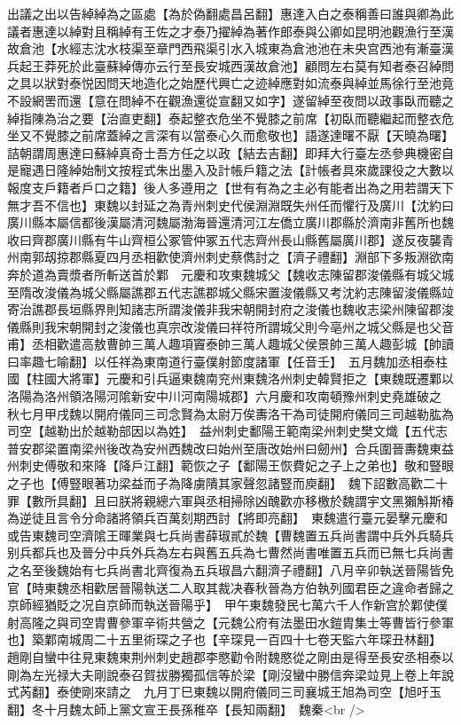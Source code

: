 出議之出以告綽綽為之區處【為於偽翻處昌呂翻】惠達入白之泰稱善曰誰與卿為此議者惠達以綽對且稱綽有王佐之才泰乃擢綽為著作郎泰與公卿如昆明池觀漁行至漢故倉池【水經志沈水枝渠至章門西飛渠引水入城東為倉池池在未央宫西池有漸臺漢兵起王莽死於此臺蘇綽傳亦云行至長安城西漢故倉池】顧問左右莫有知者泰召綽問之具以狀對泰悦因問天地造化之始歷代興亡之迹綽應對如流泰與綽並馬徐行至池竟不設網罟而還【意在問綽不在觀漁還從宣翻又如字】遂留綽至夜問以政事臥而聽之綽指陳為治之要【治直吏翻】泰起整衣危坐不覺膝之前席【初臥而聽繼起而整衣危坐又不覺膝之前席蓋綽之言深有以當泰心久而愈敬也】語遂達曙不厭【天曉為曙】詰朝謂周惠達曰蘇綽真奇士吾方任之以政【結去吉翻】即拜大行臺左丞參典機密自是寵遇日隆綽始制文按程式朱出墨入及計帳戶籍之法【計帳者具來歲課役之大數以報度支戶籍者戶口之籍】後人多遵用之【世有有為之主必有能者出為之用若謂天下無才吾不信也】東魏以封延之為青州刺史代侯淵淵既失州任而懼行及廣川【沈約曰廣川縣本屬信都後漢屬清河魏屬渤海晉還清河江左僑立廣川郡縣於濟南非舊所也魏收曰齊郡廣川縣有牛山齊桓公冢管仲冢五代志齊州長山縣舊屬廣川郡】遂反夜襲青州南郭刼掠郡縣夏四月丞相歡使濟州刺史蔡儁討之【濟子禮翻】淵部下多叛淵欲南奔於道為賣漿者所斬送首於鄴　元慶和攻東魏城父【魏收志陳留郡浚儀縣有城父城至隋改浚儀為城父縣屬譙郡五代志譙郡城父縣宋置浚儀縣又考沈約志陳留浚儀縣竝寄治譙郡長垣縣界則知諸志所謂浚儀非我宋朝開封府之浚儀也魏收志梁州陳留郡浚儀縣則我宋朝開封之浚儀也真宗改浚儀曰祥符所謂城父則今亳州之城父縣是也父音甫】丞相歡遣高敖曹帥三萬人趣項竇泰帥三萬人趣城父侯景帥三萬人趣彭城【帥讀曰率趣七喻翻】以任祥為東南道行臺僕射節度諸軍【任音壬】　五月魏加丞相泰柱國【柱國大將軍】元慶和引兵逼東魏南兖州東魏洛州刺史韓賢拒之【東魏既遷鄴以洛陽為洛州領洛陽河隂新安中川河南陽城郡】六月慶和攻南頓豫州刺史堯雄破之　秋七月甲戌魏以開府儀同三司念賢為太尉万俟夀洛干為司徒開府儀同三司越勒肱為司空【越勒出於越勒部因以為姓】　益州刺史鄱陽王範南梁州刺史樊文熾【五代志普安郡梁置南梁州後改為安州西魏改曰始州至唐改始州曰劒州】合兵圍晉夀魏東益州刺史傅敬和來降【降戶江翻】範恢之子【鄱陽王恢費妃之子上之弟也】敬和豎眼之子也【傅豎眼著功梁益而子為降虜隤其家聲忽諸豎而庾翻】　魏下詔數高歡二十罪【數所具翻】且曰朕將親總六軍與丞相掃除凶醜歡亦移檄於魏謂宇文黑獺斛斯椿為逆徒且言令分命諸將領兵百萬刻期西討【將即亮翻】　東魏遣行臺元晏擊元慶和　或告東魏司空濟隂王暉業與七兵尚書薛琡貳於魏【曹魏置五兵尚書謂中兵外兵騎兵别兵都兵也及晉分中兵外兵為左右與舊五兵為七曹然尚書唯置五兵而已無七兵尚書之名至後魏始有七兵尚書北齊復為五兵琡昌六翻濟子禮翻】八月辛卯執送晉陽皆免官【時東魏丞相歡居晉陽執送二人取其裁决春秋晉為方伯執列國君臣之違命者歸之京師經猶貶之况自京師而執送晉陽乎】　甲午東魏發民七萬六千人作新宫於鄴使僕射高隆之與司空胄曹參軍辛術共營之【元魏公府有法墨田水鎧胄集士等曹皆行參軍也】築鄴南城周二十五里術琛之子也【辛琛見一百四十七卷天監六年琛丑林翻】　趙剛自蠻中往見東魏東荆州刺史趙郡李愍勸令附魏愍從之剛由是得至長安丞相泰以剛為左光禄大夫剛說泰召賀拔勝獨孤信等於梁【剛沒蠻中勝信奔梁竝見上卷上年說式芮翻】泰使剛來請之　九月丁巳東魏以開府儀同三司襄城王旭為司空【旭吁玉翻】冬十月魏太師上黨文宣王長孫稚卒【長知兩翻】　魏秦<br />
